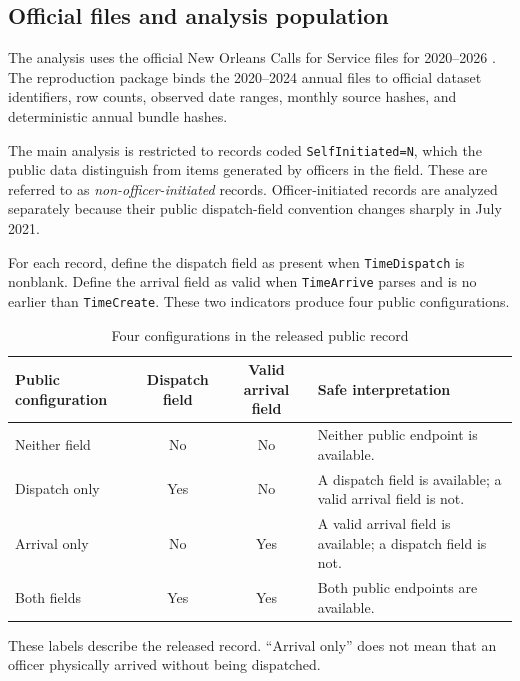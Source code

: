 \documentclass[11pt]{article}
\begin{document}
\subsection{Official files and analysis population}

The analysis uses the official New Orleans Calls for Service files for 2020--2026 \citep{DataNOLA2020,DataNOLA2021,DataNOLA2022,DataNOLA2023,DataNOLA2024,DataNOLA2025,DataNOLA2026}. The reproduction package binds the 2020--2024 annual files to official dataset identifiers, row counts, observed date ranges, monthly source hashes, and deterministic annual bundle hashes.

The main analysis is restricted to records coded \texttt{SelfInitiated=N}, which the public data distinguish from items generated by officers in the field. These are referred to as \emph{non-officer-initiated} records. Officer-initiated records are analyzed separately because their public dispatch-field convention changes sharply in July 2021.

For each record, define the dispatch field as present when \texttt{TimeDispatch} is nonblank. Define the arrival field as valid when \texttt{TimeArrive} parses and is no earlier than \texttt{TimeCreate}. These two indicators produce four public configurations.

\begin{table}[t]
\centering
\caption{Four configurations in the released public record}
\label{tab:states}
\begin{tabularx}{\textwidth}{@{}lccX@{}}
\toprule
Public configuration & Dispatch field & Valid arrival field & Safe interpretation \\
\midrule
Neither field & No & No & Neither public endpoint is available. \\
Dispatch only & Yes & No & A dispatch field is available; a valid arrival field is not. \\
Arrival only & No & Yes & A valid arrival field is available; a dispatch field is not. \\
Both fields & Yes & Yes & Both public endpoints are available. \\
\bottomrule
\end{tabularx}
\begin{minipage}{0.96\textwidth}\footnotesize
These labels describe the released record. ``Arrival only'' does not mean that an officer physically arrived without being dispatched.
\end{minipage}
\end{table}
\end{document}
